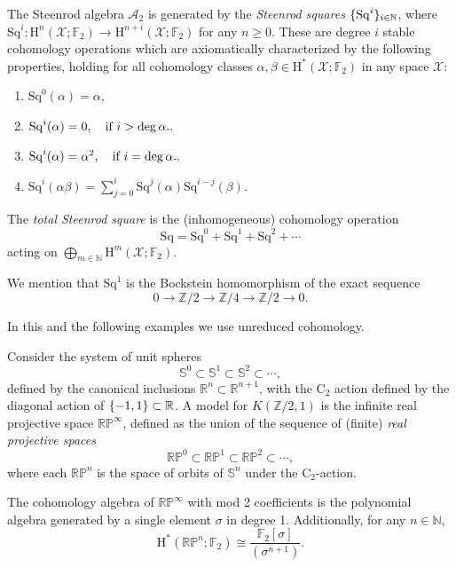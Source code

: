 \documentclass{amsart}
\makeatletter
\renewcommand\subsubsection{\@startsection{subsubsection}{3}
	\z@{.5\linespacing\@plus.7\linespacing}{0em}
	{\normalfont\itshape}}
\theoremstyle{definition}
\newcommand{\N}{\mathbb{N}}
\newcommand{\Z}{\mathbb{Z}}
\newcommand{\R}{\mathbb{R}}
\newcommand{\cyc}{\mathrm{C}}
\newcommand{\Ftwo}{{\mathbb{F}_2}}
\DeclarePairedDelimiter\set{\{}{\}}
\newcommand{\rH}{\mathrm{H}}
\newcommand{\cA}{\mathcal{A}}
\newcommand{\cX}{\mathcal{X}}
\newcommand{\bS}{\mathbb{S}}
\newcommand{\darkblue}{\color{darkblue}}
\newcommand{\defn}[1]{{\darkblue \emph{#1}}}
\newcommand{\Sq}{\mathrm{Sq}}
\theoremstyle{theorem}
\newcommand{\rp}{\mathbb{RP}}
\providecommand{\DIFaddtex}[1]{{\protect\color{blue}\uwave{#1}}} %
\providecommand{\DIFaddbegin}{} %
\providecommand{\DIFaddend}{} %
\providecommand{\DIFadd}[1]{\texorpdfstring{\DIFaddtex{#1}}{#1}} %
\newcommand{\DIFaddincludegraphics}[2][]{{\color{blue}\fbox{\DIFOincludegraphics[#1]{#2}}}} %
\DeclareRobustCommand{\DIFaddbegin}{\DIFOaddbegin \let\includegraphics\DIFaddincludegraphics} %
\DeclareRobustCommand{\DIFaddend}{\DIFOaddend \let\includegraphics\DIFOincludegraphics} %
\renewcommand{\DIFadd}[1]{{\color{red}#1}}
\newcommand{\oldmath}[1]{{\color{deletedpurple}\mathpalette\horizontalstrike{#1}}}
\newcommand{\horizontalstrike}[2]{\sbox0{$#1#2$}\rlap{\raisebox{.5\ht0}{\rule{\wd0}{.4pt}}}\usebox0}
\newcommand{\newmath}[1]{{\color{red}#1}}
\makeatother
\begin{document}
The Steenrod algebra $\cA_2$ is generated by the \defn{Steenrod squares} $\set{\Sq^i}_{i \in \N}$, where $\Sq^i \colon \rH^n(\cX; \Ftwo) \to \rH^{n+i}(\cX; \Ftwo)$ for any $n\geq 0$.
These are degree $i$ stable cohomology operations which are axiomatically characterized by the following properties, holding for all cohomology classes $\alpha,\beta \in \rH^*(\cX; \Ftwo)$ in any space $\cX$:
\begin{enumerate}
	\item \(\Sq^0(\alpha) = \alpha,\)
	\item \(\Sq^i(\alpha) = 0, \quad \text{if } i > \deg\alpha\oldmath{.}\newmath{,}\)
	\item \(\Sq^i(\alpha) = \alpha^2, \quad \text{if } i = \deg\alpha\oldmath{.}\newmath{,}\)
	\item \(\Sq^i(\alpha \beta) = \textstyle\sum_{j=0}^{i} \Sq^j(\alpha) \Sq^{i-j}(\beta).\)
\end{enumerate}

The \defn{total Steenrod square} is the (inhomogeneous) cohomology operation
\[
\Sq = \Sq^0 + \Sq^1 + \Sq^2 + \dotsb
\]
acting on \(\bigoplus_{m \in \N} \rH^m(\cX; \Ftwo)\).

We mention that $\Sq^1$ is the Bockstein homomorphism of the exact sequence
\[
0 \to \Z/2 \to \Z/4 \to \Z/2 \to 0.
\]

\subsubsection{}\label{sss:cohomology_rpn}

\DIFaddbegin \DIFadd{In this and the following examples we use unreduced cohomology.
}

\DIFaddend Consider the system of unit spheres
\[
\bS^0 \subset \bS^1 \subset \bS^2 \subset \dotsb,
\]
defined by the canonical inclusions \(\R^n \subset \R^{n+1}\), with the \(\cyc_2\) action defined by the diagonal action of \(\set{-1,1} \subset \R\).
A model for \(K(\Z/2,1)\) is the infinite real projective space \(\rp^\infty\), defined as the union of the sequence of (finite) \defn{real projective spaces}
\[
\rp^0 \subset \rp^1 \subset \rp^2 \subset \dotsb,
\]
where each \(\rp^n\) is the space of orbits of \(\bS^n\) under the \(\cyc_2\)-action.

The cohomology algebra of $\rp^\infty$ with mod 2 coefficients is the polynomial algebra generated by a single element $\sigma$ in degree 1.
Additionally, for any $n \in \N$,
\[
\rH^\ast(\rp^n; \Ftwo) \cong \frac{\Ftwo[\sigma]}{(\sigma^{n+1})}.
\]
\end{document}
